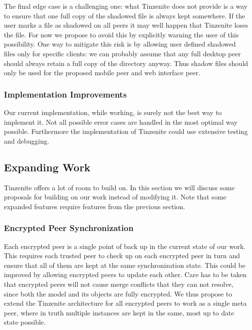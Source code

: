 The final edge case is a challenging one: what Tinzenite does not provide is a way to ensure that one full copy of the shadowed file is always kept somewhere.
If the user marks a file as shadowed on all peers it may well happen that Tinzenite loses the file.
For now we propose to avoid this by explicitly warning the user of this possibility.
One way to mitigate this risk is by allowing user defined shadowed files only for specific clients: we can probably assume that any full desktop peer should always retain a full copy of the directory anyway.
Thus shadow files should only be used for the proposed mobile peer and web interface peer.

\subsubsection{Implementation Improvements}
\label{subs:Implementation Improvements}

Our current implementation, while working, is surely not the best way to implement it.
Not all possible error cases are handled in the most optimal way possible.
Furthermore the implementation of Tinzenite could use extensive testing and debugging.

\subsection{Expanding Work}
\label{sub:Expanding Work}

Tinzenite offers a lot of room to build on.
In this section we will discuss some proposals for building on our work instead of modifying it.
Note that some expanded features require features from the previous section.

\subsubsection{Encrypted Peer Synchronization}
\label{subs:Encrypted Peer Synchronization}

Each encrypted peer is a single point of back up in the current state of our work.
This requires each trusted peer to check up on each encrypted peer in turn and ensure that all of them are kept at the same synchronization state.
This could be improved by allowing encrypted peers to update each other.
Care has to be taken that encrypted peers will not cause merge conflicts that they can not resolve, since both the model and its objects are fully encrypted.
We thus propose to extend the Tinzenite architecture for all encrypted peers to work as a single meta peer, where in truth multiple instances are kept in the same, most up to date state possible.

